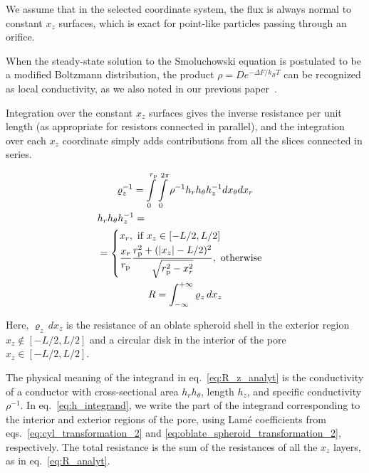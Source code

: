 \documentclass[10pt, a4paper]{article}
\begin{document}
\begin{multicols}{2}
We assume that in the selected coordinate system, the flux is always normal to constant $x_z$ surfaces, which is exact for point-like particles passing through an orifice.

When the steady-state solution to the Smoluchowski equation is postulated to be a modified Boltzmann distribution, the product $\rho = D e^{-\Delta F / k_B T}$ can be recognized as local conductivity, as we also noted in our previous paper~\cite{Laktionov2023}.

Integration over the constant $x_z$ surfaces gives the inverse resistance per unit length (as appropriate for resistors connected in parallel), and the integration over each $x_z$ coordinate simply adds contributions from all the slices connected in series.

\begin{gather}
    \label{eq:R_z_analyt}
    \varrho_{z}^{-1} = \int\displaylimits_{0}^{r_{\text{p}}} \int\displaylimits_{0}^{2\pi} \rho^{-1} h_r h_{\theta} h_z^{-1} dx_{\theta} dx_r
    \\
    \label{eq:h_integrand}
    \begin{aligned} 
        &h_r h_{\theta} h_z^{-1} = \\ &=
        \begin{cases}
            x_r, \text{ if } x_z \in [-L/2,L/2]
            \\[2pt]
            \dfrac{x_r}{r_{\text{p}}}\dfrac{r_{\text{p}}^2 + (|x_z|-L/2)^2}{\sqrt{r_{\text{p}}^2 - x_r^2}}, \text{ otherwise}
        \end{cases}
    \end{aligned}
    \\
    \label{eq:R_analyt}
    R = \int_{-\infty}^{+\infty} \varrho_{z} \, dx_z
\end{gather}

Here, $\varrho_{z} \, dx_z$ is the resistance of an oblate spheroid shell in the exterior region $x_z \notin [-L/2, L/2]$ and a circular disk in the interior of the pore $x_z \in [-L/2, L/2]$.

The physical meaning of the integrand in eq.~\ref{eq:R_z_analyt} is the conductivity of a conductor with cross-sectional area $h_r h_{\theta}$, length $h_z$, and specific conductivity $\rho^{-1}$.
In eq.~\ref{eq:h_integrand}, we write the part of the integrand corresponding to the interior and exterior regions of the pore, using Lam\'e coefficients from eqs.~\ref{eq:cyl_transformation_2} and \ref{eq:oblate_spheroid_transformation_2}, respectively.
The total resistance is the sum of the resistances of all the $x_z$ layers, as in eq.~\ref{eq:R_analyt}.


\end{multicols}
\end{document}
